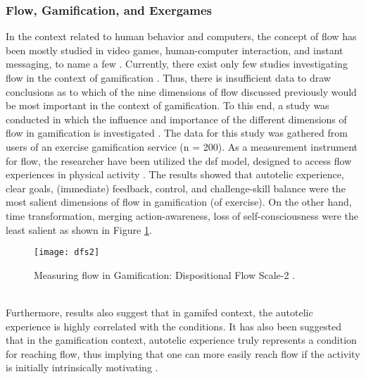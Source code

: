 \subsubsection{Flow, Gamification, and Exergames}
In the context related to human behavior and computers, the concept of flow has been mostly studied in video games, human-computer interaction, and instant messaging, to name a few \cite{hamari2014measuring}. Currently, there exist only few studies investigating flow in the context of gamification \cite{hamari2014measuring, sillaots2014achieving}. Thus, there is insufficient data to draw conclusions as to which of the nine dimensions of flow discussed previously would be most important in the context of gamification. To this end, a study was conducted in which the influence and importance of the different dimensions of flow in gamification is investigated \cite{hamari2014measuring}. The data for this study was gathered from users of an exercise gamification service (n = 200). As a measurement instrument for flow, the researcher have been utilized the \acrfull{dsf} model, designed to access flow experiences in physical activity \cite{jackson2002assessing}. The results showed that autotelic experience, clear goals, (immediate) feedback, control, and challenge-skill balance were the most salient dimensions of flow in gamification (of exercise). On the other hand, time transformation, merging action-awareness, loss of self-consciousness were the least salient as shown in Figure \ref{fig:dfs2}.\\
\begin{figure}[h]
    \centering
    \texttt{[image: dfs2]}
    \caption{Measuring flow in Gamification: Dispositional Flow Scale-2 \cite{dfs2}.}
    \label{fig:dfs2}
\end{figure}\\
Furthermore, results also suggest that in gamifed context, the autotelic experience is highly correlated with the conditions. It has also been suggested that in the gamification context, autotelic experience truly represents a condition for reaching flow, thus implying that one can more easily reach flow if the activity is initially intrinsically motivating \cite{hamari2014measuring}.\\\\

